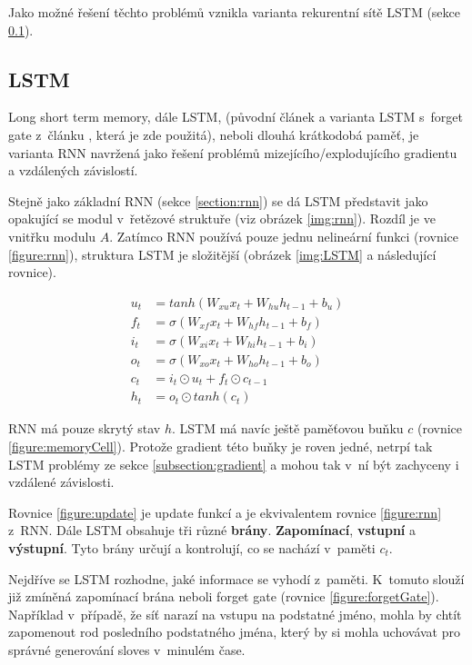 Jako možné řešení těchto problémů vznikla varianta rekurentní sítě LSTM (sekce \ref{section:LSTM}).


\subsection{LSTM}\label{section:LSTM}
Long short term memory, dále LSTM, (původní článek \cite{LSTM} a varianta LSTM s~forget gate z~článku \cite{forgetLSTM}, která je zde použitá), neboli dlouhá krátkodobá paměť, je varianta RNN navržená jako řešení problémů mizejícího/explodujícího gradientu a vzdálených závislostí.

Stejně jako základní RNN (sekce \ref{section:rnn}) se dá LSTM představit jako opakující se modul v~řetězové struktuře (viz obrázek \ref{img:rnn}). Rozdíl je ve vnitřku modulu $A$. Zatímco RNN používá pouze jednu nelineární funkci (rovnice \ref{figure:rnn}), struktura LSTM je složitější (obrázek \ref{img:LSTM} a následující rovnice).

\begin{align}
    u_{t}&=tanh(W_{xu}x_t + W_{hu}h_{t-1} + b_u) \label{figure:update} \\
    f_{t}&=\sigma(W_{xf}x_{t}+W_{hf}h_{t-1}+b_{f}) \label{figure:forgetGate} \\
    i_{t}&=\sigma(W_{xi}x_{t}+W_{hi}h_{t-1}+b_{i}) \label{figure:inputGate} \\
    o_{t}&=\sigma(W_{xo}x_{t}+W_{ho}h_{t-1}+b_{o}) \label{figure:outputGate} \\
    c_{t}&=i_{t}\odot u_{t}+f_{t}\odot c_{t-1}\label{figure:memoryCell} \\
    h_{t}&=o_{t}\odot tanh(c_{t}) \label{figure:hiddenState}
\end{align}

RNN má pouze skrytý stav $h$. LSTM má navíc ještě paměťovou buňku $c$ (rovnice \ref{figure:memoryCell}). Protože gradient této buňky je roven jedné, netrpí tak LSTM problémy ze sekce \ref{subsection:gradient} a mohou tak v~ní být zachyceny i vzdálené závislosti.

Rovnice \ref{figure:update} je update funkcí a je ekvivalentem rovnice \ref{figure:rnn} z~RNN.
Dále LSTM obsahuje tři různé \textbf{brány}. \textbf{Zapomínací}, \textbf{vstupní} a \textbf{výstupní}. Tyto brány určují a kontrolují, co se nachází v~paměti $c_t$.

Nejdříve se LSTM rozhodne, jaké informace se vyhodí z~paměti. K~tomuto slouží již zmíněná zapomínací brána neboli forget gate (rovnice \ref{figure:forgetGate}). Například v~případě, že síť narazí na vstupu na podstatné jméno, mohla by chtít zapomenout rod posledního podstatného jména, který by si mohla uchovávat pro správné generování sloves v~minulém čase.

